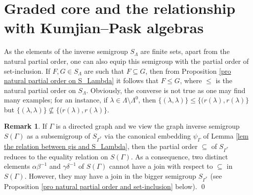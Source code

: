 \documentclass[a4paper,reqno,11pt]{amsart}
\numberwithin{equation}{section}
\theoremstyle{definition}
\newtheorem{rmk}[thm]{Remark}
\theoremstyle{remark}
\begin{document}
\section{Graded core and the relationship with Kumjian--Pask algebras}\label{sec Relation to KP-algebra}
As the elements of the inverse semigroup $S_\Lambda$ are finite sets, apart from the natural partial order, one can also equip this semigroup with the partial order of set-inclusion. If $F,G\in S_\Lambda$ are such that $F\subseteq G$, then from Proposition \ref{pro natural partial order on S_Lambda} it follows that $F\le G$, where $\le$ is the natural partial order on $S_\Lambda$. Obviously, the converse is not true as one may find many examples; for an instance, if $\lambda\in \Lambda\setminus \Lambda^0$, then $\{(\lambda,\lambda)\}\le \{(r(\lambda),r(\lambda)\}$ but $\{(\lambda,\lambda)\}\nsubseteq \{(r(\lambda),r(\lambda)\}$.

\begin{rmk}\label{rem set-inclusion for graph inverse semigroup}
If $\Gamma$ is a directed graph and we view the graph inverse semigroup $S(\Gamma)$ as a subsemigroup of $S_{\Gamma^*}$ via the canonical embedding $\psi_\Gamma$ of Lemma \ref{lem the relation between gis and S_Lambda}, then the partial order $\subseteq$ of $S_{\Gamma^*}$ reduces to the equality relation on $S(\Gamma)$. As a consequence, two distinct elements $\alpha\beta^{-1}$ and $\gamma\delta^{-1}$ of $S(\Gamma)$ cannot have a join with respect to $\subseteq$ in $S(\Gamma)$. However, they may have a join in the bigger semigroup $S_{\Gamma^*}$ (see Proposition \ref{pro natural partial order and set-inclusion} below). \qed      
\end{rmk}
\end{document}
